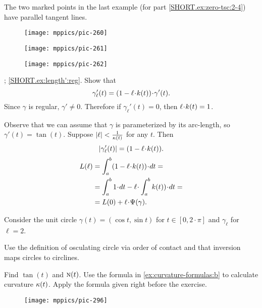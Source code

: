 The two marked points in the last example (for part \ref{SHORT.ex:zero-tsc:2-4}) have parallel tangent lines.

\begin{figure}[h!]
\begin{minipage}{.32\textwidth}
\centering
\texttt{[image: mppics/pic-260]}
\end{minipage}\hfill
\begin{minipage}{.32\textwidth}
\centering
\texttt{[image: mppics/pic-261]}
\end{minipage}
\hfill
\begin{minipage}{.32\textwidth}
\centering
\texttt{[image: mppics/pic-262]}
\end{minipage}
\end{figure}

\parbf{\ref{ex:length'}}; \ref{SHORT.ex:length':reg}.
Show that
\[
\gamma_\ell'(t)=(1-\ell\cdot\skur(t))\cdot \gamma'(t).
\]
Since $\gamma$ is regular, $\gamma'\ne0$.
Therefore if $\gamma_\ell'(t)=0$, then $\ell\cdot \skur(t)= 1$.

 Observe that we can assume that $\gamma$ is parameterized by its arc-length, so $\gamma'(t)=\tan(t)$.
Suppose $|\ell|<\frac{1}{\kappa(t)}$ for any $t$.
Then 
\[
|\gamma_\ell'(t)|=(1-\ell\cdot\skur(t)).
\]
\begin{align*}
L(\ell)&=\int_a^b(1-\ell\cdot\skur(t))\cdot dt=
\\
&=\int_a^b 1\cdot dt-\ell\cdot \int_a^b\skur(t))\cdot dt=
\\
&=L(0)+\ell\cdot\Psi(\gamma).
\end{align*}



Consider the unit circle $\gamma(t)=(\cos t,\sin t)$ for $t\in[0,2\cdot\pi]$ and $\gamma_\ell$ for $\ell=2$.

Use the definition of osculating circle via order of contact and that inversion maps circles to circlines. 

Find $\tan(t)$ and $\textsc{n}(t)$.
Use the formula in \ref{ex:curvature-formulas:b} to calculate curvature $\kappa(t)$.
Apply the formula given right before the exercise.

\begin{wrapfigure}{r}{15 mm}
\vskip-0mm
\centering
\texttt{[image: mppics/pic-296]}
\vskip0mm
\end{wrapfigure}

